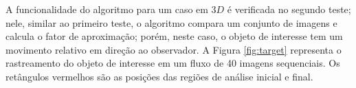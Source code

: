 A funcionalidade do algoritmo para um caso em $3D$ é verificada no segundo teste;
nele, similar ao primeiro teste, o algoritmo compara um conjunto de imagens 
e calcula o fator de aproximação; porém, neste caso, o objeto de interesse tem um movimento
relativo em direção ao observador. A Figura \ref{fig:target} representa o 
rastreamento  do objeto de interesse em um fluxo de 40 imagens sequenciais. Os retângulos vermelhos
são as posições das regiões de análise inicial e final.


